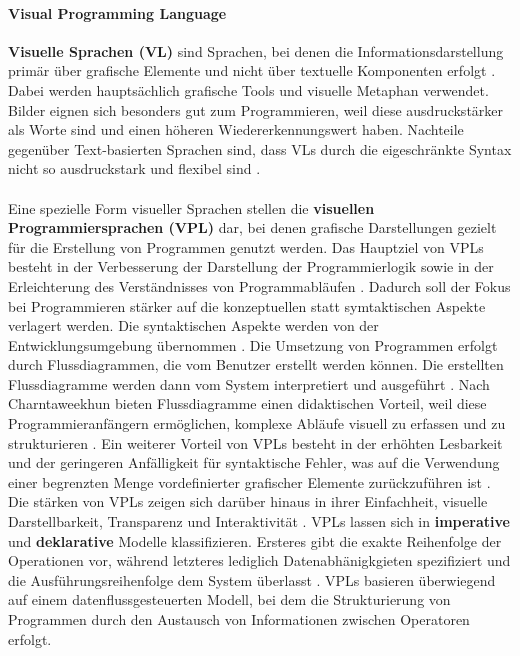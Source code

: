     \paragraph{Visual Programming Language}
    \textbf{Visuelle Sprachen (VL)} sind Sprachen, bei denen die Informationsdarstellung primär über grafische Elemente und nicht über textuelle Komponenten erfolgt \cite{5}.
    Dabei werden hauptsächlich grafische Tools und visuelle Metaphan verwendet. 
    Bilder eignen sich besonders gut zum Programmieren, weil diese ausdruckstärker als Worte sind und einen höheren Wiedererkennungswert haben.
    Nachteile gegenüber Text-basierten Sprachen sind, dass VLs durch die eigeschränkte Syntax nicht so ausdruckstark und flexibel sind \cite{16}.\\
    \\
    Eine spezielle Form visueller Sprachen stellen die \textbf{visuellen Programmiersprachen (VPL)} dar, bei denen grafische Darstellungen gezielt für die Erstellung von Programmen genutzt werden.    
    Das Hauptziel von VPLs besteht in der Verbesserung der Darstellung der Programmierlogik sowie in der Erleichterung des Verständnisses von Programmabläufen \cite{13}.
    Dadurch soll der Fokus bei Programmieren stärker auf die konzeptuellen statt symtaktischen Aspekte verlagert werden. 
    Die syntaktischen Aspekte werden von der Entwicklungsumgebung übernommen \cite{10}.
    Die Umsetzung von Programmen erfolgt durch Flussdiagrammen, die vom Benutzer erstellt werden können. 
    Die erstellten Flussdiagramme werden dann vom System interpretiert und ausgeführt \cite{12}.
    Nach Charntaweekhun bieten Flussdiagramme einen didaktischen Vorteil, weil diese Programmieranfängern ermöglichen, komplexe Abläufe visuell zu erfassen und zu strukturieren \cite{12}.
    Ein weiterer Vorteil von VPLs besteht in der erhöhten Lesbarkeit und der geringeren Anfälligkeit für syntaktische Fehler, was auf die Verwendung einer begrenzten Menge vordefinierter grafischer Elemente zurückzuführen ist \cite{10}.
    Die stärken von VPLs zeigen sich darüber hinaus in ihrer Einfachheit, visuelle Darstellbarkeit, Transparenz und Interaktivität \cite{13}.
    VPLs lassen sich in \textbf{imperative} und \textbf{deklarative} Modelle klassifizieren. Ersteres gibt die exakte Reihenfolge der Operationen vor, während letzteres lediglich Datenabhänigkgieten spezifiziert und die Ausführungsreihenfolge dem System überlasst \cite{21}.
    VPLs basieren überwiegend auf einem datenflussgesteuerten Modell, bei dem die Strukturierung von Programmen durch den Austausch von Informationen zwischen Operatoren erfolgt. \cite{6}
